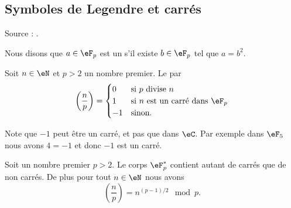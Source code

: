 \subsection{Symboles de Legendre et carrés}

Source : \cite{RecQuadVento}.

Nous disons que \( a\in \eF_p\) est un  s'il existe \( b\in \eF_p\) tel que \( a=b^2\).

\begin{definition}
    Soit \( n\in \eN\) et \( p>2\) un nombre premier. Le  par
    \begin{equation}
        \left( \frac{ n }{ p } \right)=\begin{cases}
            0    &   \text{si } p\text{ divise } n\\
            1    &    \text{si } n\text{ est un carré dans } \eF_p\\
            -1    &    \text{sinon}.
        \end{cases}
    \end{equation}
\end{definition}

Note que \( -1\) peut être un carré, et pas que dans \( \eC\). Par exemple dans \( \eF_5\) nous avons \( 4=-1\) et donc \( -1\) est un carré.

\begin{proposition} \label{PropcGsJjk}
    Soit un nombre premier \( p>2\). Le corps \( \eF_p^*\) contient autant de carrés que de non carrés. De plus pour tout \( n\in \eN\) nous avons
    \begin{equation}    \label{Eqbcugos}
        \left(\frac{n}{p}\right)=n^{(p-1)/2}\mod p.
    \end{equation}
\end{proposition}

